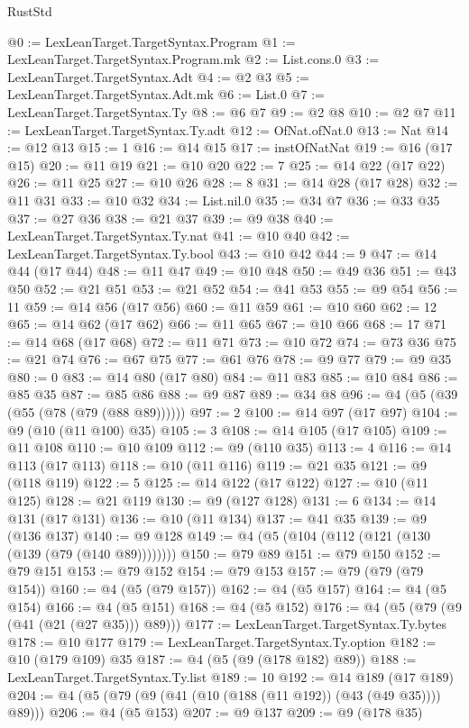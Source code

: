 \begin{lexlean}{RustStd}
\begin{coremodule}
@0 := LexLeanTarget.TargetSyntax.Program
@1 := LexLeanTarget.TargetSyntax.Program.mk
@2 := List.cons.{0}
@3 := LexLeanTarget.TargetSyntax.Adt
@4 := @2 @3
@5 := LexLeanTarget.TargetSyntax.Adt.mk
@6 := List.{0}
@7 := LexLeanTarget.TargetSyntax.Ty
@8 := @6 @7
@9 := @2 @8
@10 := @2 @7
@11 := LexLeanTarget.TargetSyntax.Ty.adt
@12 := OfNat.ofNat.{0}
@13 := Nat
@14 := @12 @13
@15 := 1
@16 := @14 @15
@17 := instOfNatNat
@19 := @16 (@17 @15)
@20 := @11 @19
@21 := @10 @20
@22 := 7
@25 := @14 @22 (@17 @22)
@26 := @11 @25
@27 := @10 @26
@28 := 8
@31 := @14 @28 (@17 @28)
@32 := @11 @31
@33 := @10 @32
@34 := List.nil.{0}
@35 := @34 @7
@36 := @33 @35
@37 := @27 @36
@38 := @21 @37
@39 := @9 @38
@40 := LexLeanTarget.TargetSyntax.Ty.nat
@41 := @10 @40
@42 := LexLeanTarget.TargetSyntax.Ty.bool
@43 := @10 @42
@44 := 9
@47 := @14 @44 (@17 @44)
@48 := @11 @47
@49 := @10 @48
@50 := @49 @36
@51 := @43 @50
@52 := @21 @51
@53 := @21 @52
@54 := @41 @53
@55 := @9 @54
@56 := 11
@59 := @14 @56 (@17 @56)
@60 := @11 @59
@61 := @10 @60
@62 := 12
@65 := @14 @62 (@17 @62)
@66 := @11 @65
@67 := @10 @66
@68 := 17
@71 := @14 @68 (@17 @68)
@72 := @11 @71
@73 := @10 @72
@74 := @73 @36
@75 := @21 @74
@76 := @67 @75
@77 := @61 @76
@78 := @9 @77
@79 := @9 @35
@80 := 0
@83 := @14 @80 (@17 @80)
@84 := @11 @83
@85 := @10 @84
@86 := @85 @35
@87 := @85 @86
@88 := @9 @87
@89 := @34 @8
@96 := @4 (@5 (@39 (@55 (@78 (@79 (@88 @89))))))
@97 := 2
@100 := @14 @97 (@17 @97)
@104 := @9 (@10 (@11 @100) @35)
@105 := 3
@108 := @14 @105 (@17 @105)
@109 := @11 @108
@110 := @10 @109
@112 := @9 (@110 @35)
@113 := 4
@116 := @14 @113 (@17 @113)
@118 := @10 (@11 @116)
@119 := @21 @35
@121 := @9 (@118 @119)
@122 := 5
@125 := @14 @122 (@17 @122)
@127 := @10 (@11 @125)
@128 := @21 @119
@130 := @9 (@127 @128)
@131 := 6
@134 := @14 @131 (@17 @131)
@136 := @10 (@11 @134)
@137 := @41 @35
@139 := @9 (@136 @137)
@140 := @9 @128
@149 := @4 (@5 (@104 (@112 (@121 (@130 (@139 (@79 (@140 @89))))))))
@150 := @79 @89
@151 := @79 @150
@152 := @79 @151
@153 := @79 @152
@154 := @79 @153
@157 := @79 (@79 (@79 @154))
@160 := @4 (@5 (@79 @157))
@162 := @4 (@5 @157)
@164 := @4 (@5 @154)
@166 := @4 (@5 @151)
@168 := @4 (@5 @152)
@176 := @4 (@5 (@79 (@9 (@41 (@21 (@27 @35))) @89)))
@177 := LexLeanTarget.TargetSyntax.Ty.bytes
@178 := @10 @177
@179 := LexLeanTarget.TargetSyntax.Ty.option
@182 := @10 (@179 @109) @35
@187 := @4 (@5 (@9 (@178 @182) @89))
@188 := LexLeanTarget.TargetSyntax.Ty.list
@189 := 10
@192 := @14 @189 (@17 @189)
@204 := @4 (@5 (@79 (@9 (@41 (@10 (@188 (@11 @192)) (@43 (@49 @35)))) @89)))
@206 := @4 (@5 @153)
@207 := @9 @137
@209 := @9 (@178 @35)

\end{coremodule}
\end{lexlean}
